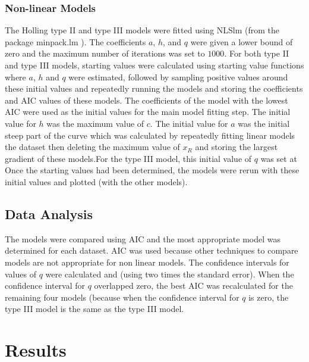 \documentclass{article}
\begin{document}
\subsubsection{Non-linear Models}
The Holling type II and type III models were fitted using NLSlm (from the package minpack.lm \parencite{Elzhov2016}). The coefficients $a$, $h$, and $q$ were given a lower bound of zero and the maximum number of iterations was set to $1000$. For both type II and type III models, starting values were calculated using starting value functions where $a$, $h$ and $q$ were estimated, followed by sampling positive values around these initial values and repeatedly running the models and storing the coefficients and AIC values of these models. The coefficients of the model with the lowest AIC were used as the initial values for the main model fitting step. The initial value for $h$ was the maximum value of $c$. The initial value for $a$ was the initial steep part of the curve which was calculated by repeatedly fitting linear models the dataset then deleting the maximum value of $x_R$ and storing the largest gradient of these models.For the type III model, this initial value of $q$ was set at %
Once the starting values had been determined, the models were rerun with these initial values and plotted (with the other models). %
\subsection{Data Analysis}
The models were compared using AIC and the most appropriate model was determined for each dataset. AIC was used because other techniques to compare models are not appropriate for non linear models.  %
The confidence intervals for values of $q$ were calculated and (using two times the standard error). When the confidence interval for $q$ overlapped zero, the best AIC was recalculated for the remaining four models (because when the confidence interval for $q$ is zero, the type III model is the same as the type III model.  %

\section{Results}
\end{document}
